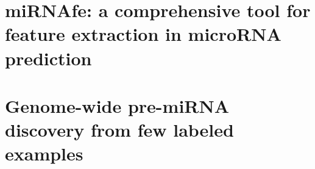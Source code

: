 \begin{appendices}
	\chapter{miRNAfe: a comprehensive tool for feature extraction in microRNA prediction}
	\label{sec:mirnafe}
	
	
	\chapter{Genome-wide pre-miRNA discovery from few labeled examples}
	\label{sec:mirnass}
	
	
\end{appendices}
